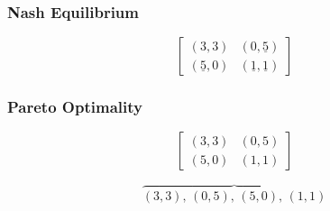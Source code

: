 \begin{frame}
    \frametitle{Nash Equilibrium}
    
    \centering
    \begin{equation*}
        \begin{bmatrix}
            (3,3) & (0,\underline{5}) \\
            (\underline{5},0) & (\underline{1},\underline{1})
        \end{bmatrix}
    \end{equation*}

\end{frame}



\begin{frame}
    \frametitle{Pareto Optimality}
    
    \centering
    \begin{equation*}
        \begin{bmatrix}
            (3,3) & (0,5) \\
            (5,0) & (1,1)
        \end{bmatrix}
    \end{equation*}

    \vspace{-0.5cm}
    \begin{equation*}
        \overbrace{(3,3), \, (0,5), \, (5,0), \, (1,1)}
    \end{equation*}
\end{frame}


